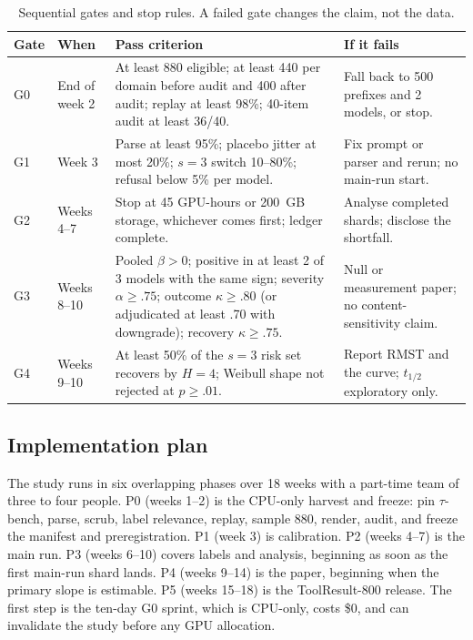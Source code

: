 \documentclass[11pt,a4paper]{article}
\begin{document}
\begin{table}[H]
\centering
\small
\caption{Sequential gates and stop rules. A failed gate changes the claim, not the data.}
\label{tab:gates}
\begin{tabularx}{\textwidth}{@{}l l X X@{}}
\toprule
Gate & When & Pass criterion & If it fails \\
\midrule
G0 & End of week 2 & At least 880 eligible; at least 440 per domain before audit and 400 after audit; replay at least 98\%; 40-item audit at least 36/40. & Fall back to 500 prefixes and 2 models, or stop. \\
G1 & Week 3 & Parse at least 95\%; placebo jitter at most 20\%; $s=3$ switch 10--80\%; refusal below 5\% per model. & Fix prompt or parser and rerun; no main-run start. \\
G2 & Weeks 4--7 & Stop at 45 GPU-hours or 200~GB storage, whichever comes first; ledger complete. & Analyse completed shards; disclose the shortfall. \\
G3 & Weeks 8--10 & Pooled $\beta>0$; positive in at least 2 of 3 models with the same sign; severity $\alpha \ge .75$; outcome $\kappa \ge .80$ (or adjudicated at least .70 with downgrade); recovery $\kappa \ge .75$. & Null or measurement paper; no content-sensitivity claim. \\
G4 & Weeks 9--10 & At least 50\% of the $s=3$ risk set recovers by $H=4$; Weibull shape not rejected at $p \ge .01$. & Report RMST and the curve; $t_{1/2}$ exploratory only. \\
\bottomrule
\end{tabularx}
\end{table}

\subsection{Implementation plan}
The study runs in six overlapping phases over 18 weeks with a part-time team of three to four
people. P0 (weeks 1--2) is the CPU-only harvest and freeze: pin $\tau$-bench, parse, scrub, label
relevance, replay, sample 880, render, audit, and freeze the manifest and preregistration. P1 (week
3) is calibration. P2 (weeks 4--7) is the main run. P3 (weeks 6--10) covers labels and analysis,
beginning as soon as the first main-run shard lands. P4 (weeks 9--14) is the paper, beginning when
the primary slope is estimable. P5 (weeks 15--18) is the ToolResult-800 release. The first step is the
ten-day G0 sprint, which is CPU-only, costs \$0, and can invalidate the study before any GPU
allocation.
\end{document}
